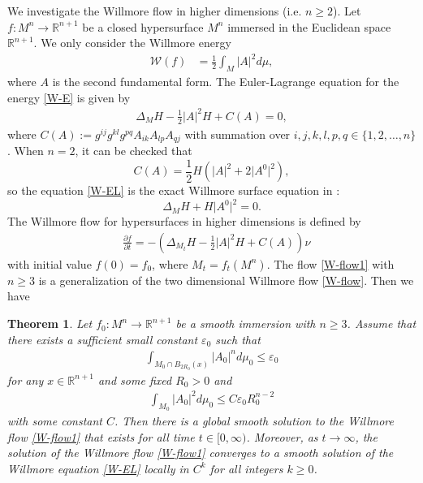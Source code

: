 \documentclass{amsart}
\newtheorem{theorem}{Theorem}[section]
\theoremstyle{definition}
\numberwithin{equation}{section}
\begin{document}
We investigate the Willmore flow in higher dimensions (i.e. $n\geq 2$).
Let $f: M^n\to \mathbb R^{n+1}$ be a closed hypersurface $M^n$ immersed in the Euclidean space $\mathbb R^{n+1}$.   We only consider the Willmore energy
\begin{align}\label{W-E}
{\mathcal W(f)}&=\frac 12 \int_{M} |A|^2 d\mu,
\end{align}
where $A$ is   the second fundamental form.
The Euler-Lagrange equation for the energy \eqref{W-E} is given by
\begin{align}\label{W-EL}
\Delta_{M} H-\frac{1}{2}\vert A\vert^2 H+C(A)=0,
\end{align}
where    $C(A):=g^{ij}g^{kl}g^{pq}A_{ik}A_{lp}A_{qj}$ with
summation over $i, j, k, l, p ,q\in \{1,2, \ldots, n\}$.
When $n=2$, it can be checked  that \[C(A)=\frac{1}{2}H(\vert A\vert^2+2\vert A^0\vert^2),\]  so the equation \eqref{W-EL} is  the exact  Willmore surface equation  in  \cite{KS2}:
$$\Delta_{M} H + H\vert A^0\vert^2 =0.$$
The Willmore flow for  hypersurfaces in higher dimensions
is defined by
\begin{align} \label{W-flow1}
  &\frac{\partial f}{\partial t}  = -\left(\Delta_{M_t} H-\frac{1}{2}\vert A\vert^2 H+C(A)\right) \nu
\end{align}
with initial value $f \left(  0 \right)=f_0$, where
$M_{t} = f_{t} \left( M^n \right)$.
The flow \eqref{W-flow1}  with $n\geq 3$ is  a generalization of the two dimensional  Willmore flow \eqref{W-flow}.
Then we have
\begin{theorem} \label{T4}
Let $f_0: M^n \rightarrow \mathbb{R}^{n+1}$ be a smooth  immersion with $n\geq 3$.
Assume that  there exists a  sufficient small   constant  $\varepsilon_0 $   such
that
 \begin{align} \label{WC1}
\int_{ M_0 \cap B_{2R_0}(x)  } \left| A_{0} \right|^{n} d\mu_{0} \leq \varepsilon_{0}
 \end{align}
for any $x\in \mathbb{R}^{n+1}$ and some fixed  $R_0>0$ and
\begin{align} \label{C2}
 \int_{M_0 }    |A_{0} |^{2} d\mu_{0} \leq C \varepsilon_0 R_0^{n-2}
 \end{align} with  some constant $C$.
  Then there is a global  smooth solution to the Willmore flow \eqref{W-flow1} that exists for all time $t\in [0,\infty)$.
  Moreover, as $t\to \infty$, the solution of the Willmore flow \eqref{W-flow1} converges to  a smooth solution of the Willmore equation \eqref{W-EL} locally in $C^k$ for all integers $k\geq 0$.
\end{theorem}
\end{document}
